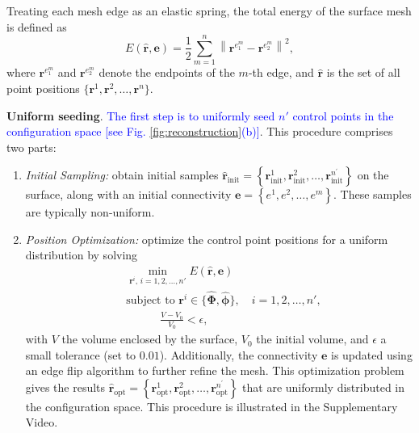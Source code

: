 \documentclass[journal]{IEEEtran}
\theoremstyle{definition}
\begin{document}
Treating each mesh edge as an elastic spring, the total energy of the surface mesh is defined as
\begin{equation}
  E(\hat{\mathbf{r}}, \mathbf{e}) = \frac{1}{2} \sum_{m=1}^{n} \left\|\mathbf{r}^{e^m_1} - \mathbf{r}^{e^m_2}\right\|^2,
  \label{eq:potential_energy_harmonics}
\end{equation}
where \(\mathbf{r}^{e^m_1}\) and \(\mathbf{r}^{e^m_2}\) denote the endpoints of the $m$-th edge, and \(\hat{\mathbf{r}}\) is the set of all point positions $\{\mathbf{r}^1, \mathbf{r}^2, \dots, \mathbf{r}^n\}$.

\textbf{Uniform seeding}. \textcolor{blue}{The first step is to uniformly seed \(n'\) control points in the configuration space [see Fig. \ref{fig:reconstruction}(b)]}. This procedure comprises two parts:
\begin{enumerate}
  \item \textit{Initial Sampling:} obtain initial samples \(\hat{\mathbf{r}}_\text{init} = \left\{{\mathbf{r}}_\text{init}^1,{\mathbf{r}}_\text{init}^2,\dots,{\mathbf{r}}_\text{init}^{n^\prime}\right\}\) on the surface, along with an initial connectivity $\mathbf{e} = \left\{e^1,e^2,\dots,e^m\right\}$. These samples are typically non-uniform.
  \item \textit{Position Optimization:} optimize the control point positions for a uniform distribution by solving
  \begin{equation}
    \begin{aligned}
      &\min_{\mathbf{r}^i,\, i=1,2,\dots,n'} E\left(\hat{\mathbf{r}}, \mathbf{e}\right) \\
      &\text{subject to } \mathbf{r}^i \in \{\hat{\mathbf{\Phi}}, \hat{\boldsymbol{\phi}}\}, \quad i=1,2,\dots,n', \\
      &\quad\quad \quad \frac{V-V_0}{V_0} < \epsilon,
    \end{aligned}
    \label{eq:potential_energy_surface}
  \end{equation}
with \(V\) the volume enclosed by the surface, \(V_0\) the initial volume, and \(\epsilon\) a small tolerance (set to $0.01$). Additionally, the connectivity \(\mathbf{e}\) is updated using an edge flip algorithm to further refine the mesh. This optimization problem gives the results $\hat{\mathbf{r}}_\text{opt} = \left\{{\mathbf{r}}_\text{opt}^1,{\mathbf{r}}_\text{opt}^2,\dots,{\mathbf{r}}_\text{opt}^{n^\prime}\right\}$ that are uniformly distributed in the configuration space. This procedure is illustrated in the Supplementary Video.
\end{enumerate}
\end{document}

